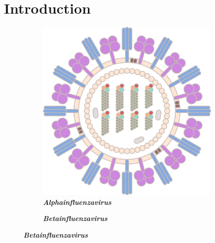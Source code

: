 \chapter{Introduction} \label{chap:Introduction}

\blindtext

\begin{figure}
    \centering
    \begin{subfigure}[b]{0.475\textwidth}
        \caption[\textit{Alphainfluenzavirus}]{\textbf{\textit{Alphainfluenzavirus}}}
        \label{subfig:Influenza_A}
        \includegraphics[width=\textwidth]{Graphics/Influenza_A.pdf}
    \end{subfigure}
    \hfill
    \begin{subfigure}[b]{0.475\textwidth}
        \caption[\textit{Betainfluenzavirus}]{\textbf{\textit{Betainfluenzavirus}}}
        \label{subfig:Influenza_B}

\end{subfigure}
\end{figure}
